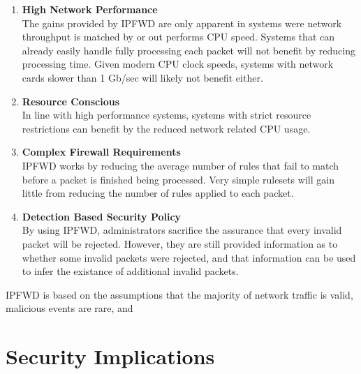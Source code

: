 \documentclass[journal]{IEEEtran}
\begin{document}
\begin{enumerate}
    \item \textbf{High Network Performance}\\
      The gains provided by IPFWD are only apparent in systems were network
      throughput is matched by or out performs CPU speed. Systems that can
      already easily handle fully processing each packet will not benefit by
      reducing processing time. Given modern CPU clock speeds, systems with
      network cards slower than 1 Gb/sec will likely not benefit either.

    \item \textbf{Resource Conscious}\\
      In line with high performance systems, systems with strict resource
      restrictions can benefit by the reduced network related CPU usage.

    \item \textbf{Complex Firewall Requirements}\\
      IPFWD works by reducing the average number of rules that fail to match
      before a packet is finished being processed. Very simple rulesets will
      gain little from reducing the number of rules applied to each packet.

    \item \textbf{Detection Based Security Policy}\\ 
      By using IPFWD, administrators sacrifice the assurance that every invalid
      packet will be rejected.  However, they are still provided information as
      to whether some invalid packets were rejected, and that information can
      be used to infer the existance of additional invalid packets. 

\end{enumerate}

IPFWD is based on the assumptions that the majority of network traffic is
valid, malicious events are rare, and 


\section{Security Implications}




\end{document}
